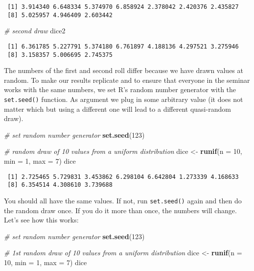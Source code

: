 \documentclass[]{article}
\newenvironment{Shaded}{\begin{snugshade}}{\end{snugshade}}
\newcommand{\CommentTok}[1]{\textcolor[rgb]{0.56,0.35,0.01}{\textit{#1}}}
\newcommand{\DataTypeTok}[1]{\textcolor[rgb]{0.13,0.29,0.53}{#1}}
\newcommand{\DecValTok}[1]{\textcolor[rgb]{0.00,0.00,0.81}{#1}}
\newcommand{\KeywordTok}[1]{\textcolor[rgb]{0.13,0.29,0.53}{\textbf{#1}}}
\newcommand{\NormalTok}[1]{#1}
\newcommand{\StringTok}[1]{\textcolor[rgb]{0.31,0.60,0.02}{#1}}
\begin{document}
\begin{verbatim}
 [1] 3.914340 6.648334 5.374970 6.858924 2.378042 2.420376 2.435827
 [8] 5.025957 4.946409 2.603442
\end{verbatim}

\begin{Shaded}
\begin{Highlighting}[]
\CommentTok{# second draw}
\NormalTok{dice2}
\end{Highlighting}
\end{Shaded}

\begin{verbatim}
 [1] 6.361785 5.227791 5.374180 6.761897 4.188136 4.297521 3.275946
 [8] 3.158357 5.006695 2.745375
\end{verbatim}

The numbers of the first and second roll differ because we have drawn values at random. To make our results replicate and to ensure that everyone in the seminar works with the same numbers, we set R's random number generator with the \texttt{set.seed()} function. As argument we plug in some arbitrary value (it does not matter which but using a different one will lead to a different quasi-random draw).

\begin{Shaded}
\begin{Highlighting}[]
\CommentTok{# set random number generator}
\KeywordTok{set.seed}\NormalTok{(}\DecValTok{123}\NormalTok{)}

\CommentTok{# random draw of 10 values from a uniform distribution}
\NormalTok{dice <-}\StringTok{ }\KeywordTok{runif}\NormalTok{(}\DataTypeTok{n =} \DecValTok{10}\NormalTok{, }\DataTypeTok{min =} \DecValTok{1}\NormalTok{, }\DataTypeTok{max =} \DecValTok{7}\NormalTok{)}
\NormalTok{dice}
\end{Highlighting}
\end{Shaded}

\begin{verbatim}
 [1] 2.725465 5.729831 3.453862 6.298104 6.642804 1.273339 4.168633
 [8] 6.354514 4.308610 3.739688
\end{verbatim}

You should all have the same values. If not, run \texttt{set.seed()} again and then do the random draw once. If you do it more than once, the numbers will change. Let's see how this works:

\begin{Shaded}
\begin{Highlighting}[]
\CommentTok{# set random number generator}
\KeywordTok{set.seed}\NormalTok{(}\DecValTok{123}\NormalTok{)}

\CommentTok{# 1st random draw of 10 values from a uniform distribution}
\NormalTok{dice <-}\StringTok{ }\KeywordTok{runif}\NormalTok{(}\DataTypeTok{n =} \DecValTok{10}\NormalTok{, }\DataTypeTok{min =} \DecValTok{1}\NormalTok{, }\DataTypeTok{max =} \DecValTok{7}\NormalTok{)}
\NormalTok{dice}
\end{Highlighting}
\end{Shaded}
\end{document}
